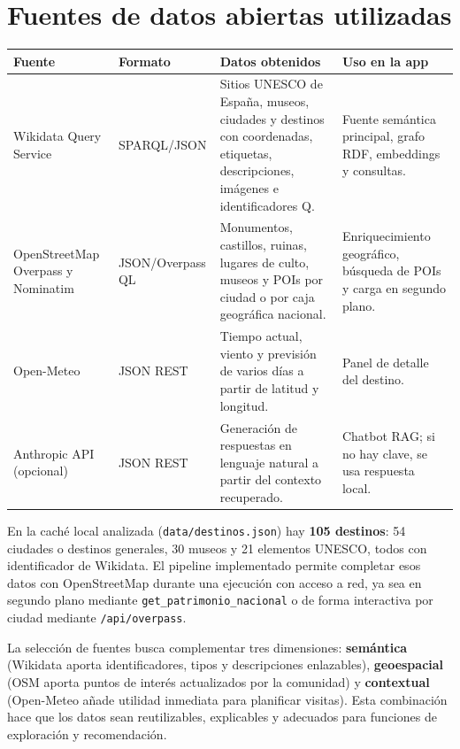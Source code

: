 \documentclass[10pt,a4paper]{article}
\begin{document}
\section{Fuentes de datos abiertas utilizadas}

\begin{table}[H]
\centering
\small
\begin{tabularx}{\textwidth}{>{\raggedright\arraybackslash}p{2.25cm}>{\raggedright\arraybackslash}p{2.25cm}>{\raggedright\arraybackslash}X>{\raggedright\arraybackslash}p{3.15cm}}
\toprule
\textbf{Fuente} & \textbf{Formato} & \textbf{Datos obtenidos} & \textbf{Uso en la app}\\
\midrule
Wikidata Query Service & SPARQL\slash{}JSON & Sitios UNESCO de España, museos, ciudades y destinos con coordenadas, etiquetas, descripciones, imágenes e identificadores Q. & Fuente semántica principal, grafo RDF, embeddings y consultas.\\
OpenStreetMap Overpass y Nominatim & JSON\slash{}Overpass QL & Monumentos, castillos, ruinas, lugares de culto, museos y POIs por ciudad o por caja geográfica nacional. & Enriquecimiento geográfico, búsqueda de POIs y carga en segundo plano.\\
Open-Meteo & JSON REST & Tiempo actual, viento y previsión de varios días a partir de latitud y longitud. & Panel de detalle del destino.\\
Anthropic API (opcional) & JSON REST & Generación de respuestas en lenguaje natural a partir del contexto recuperado. & Chatbot RAG; si no hay clave, se usa respuesta local.\\
\bottomrule
\end{tabularx}
\end{table}

En la caché local analizada (\texttt{data/destinos.json}) hay \textbf{105 destinos}: 54 ciudades o destinos generales, 30 museos y 21 elementos UNESCO, todos con identificador de Wikidata. El pipeline implementado permite completar esos datos con OpenStreetMap durante una ejecución con acceso a red, ya sea en segundo plano mediante \texttt{get\_patrimonio\_nacional} o de forma interactiva por ciudad mediante \texttt{/api/overpass}.

La selección de fuentes busca complementar tres dimensiones: \textbf{semántica} (Wikidata aporta identificadores, tipos y descripciones enlazables), \textbf{geoespacial} (OSM aporta puntos de interés actualizados por la comunidad) y \textbf{contextual} (Open-Meteo añade utilidad inmediata para planificar visitas). Esta combinación hace que los datos sean reutilizables, explicables y adecuados para funciones de exploración y recomendación.
\end{document}
